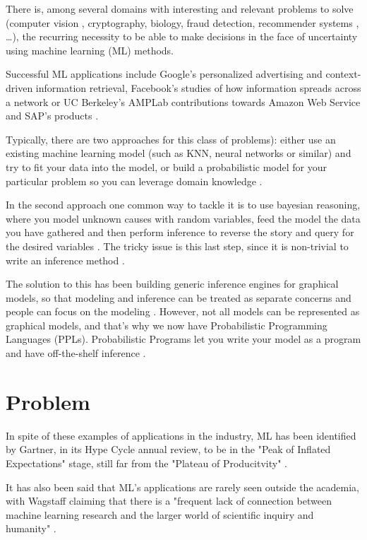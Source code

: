 There is, among several domains with interesting and relevant problems to solve
(computer vision \cite{Kulkarni2015}, cryptography, biology, fraud detection,
recommender systems \cite{intml}, …), the recurring necessity to be able to
make decisions in the face of uncertainty using machine learning (ML) methods.

Successful ML applications include Google's personalized advertising and
context-driven information retrieval, Facebook's studies of how information
spreads across a network or UC Berkeley's AMPLab contributions towards Amazon
Web Service and SAP's products \cite{Broder:2015:BDN:2684822.2697027}.

Typically, there are two approaches for this class of problems): either use an
existing machine learning model (such as KNN, neural networks or similar) \cite{mlnot} and
try to fit your data into the model, or build a probabilistic model for your
particular problem so you can leverage domain knowledge \cite{SciPy}.

In the second approach one common way to tackle it is to use bayesian reasoning,
where you model unknown causes with random variables, feed the model the data you
have gathered and then perform inference to reverse the story and query for the
desired variables \cite{thbay}. The tricky issue is this last step, since it is non-trivial
to write an inference method \cite{Duvenaud}.

The solution to this has been building generic inference engines for graphical
models, so that modeling and inference can be treated as separate concerns and
people can focus on the modeling \cite{Jordan1996}. However, not all models can be represented as
graphical models, and that’s why we now have Probabilistic Programming Languages
(PPLs). Probabilistic Programs let you write your model as a program and have
off-the-shelf inference \cite{Prekopa2003}.

\section{Problem} \label{sec:proj}

In spite of these examples of applications in the industry, ML has been
identified by Gartner, in its Hype Cycle annual review,
to be in the "Peak of Inflated Expectations" stage, still far
from the "Plateau of Producitvity" \cite{gartner}.

It has also been said that ML's applications are rarely seen
outside the academia, with Wagstaff claiming that there is a "frequent lack of
connection between machine learning research and the larger world of scientific
inquiry and humanity" \cite{Wagstaff2012}.

